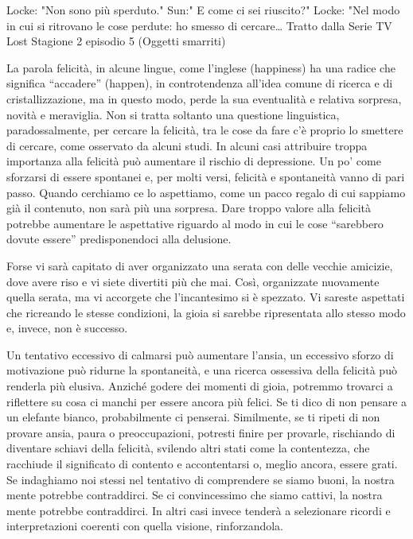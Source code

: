 \documentclass[12pt]{book} %
\begin{document}
Locke: "Non sono più sperduto." 
Sun:" E come ci sei riuscito?" 
Locke: "Nel modo in cui si ritrovano le cose perdute: ho smesso di cercare…
Tratto dalla Serie TV Lost Stagione 2 episodio 5 (Oggetti smarriti)

La parola felicità, in alcune lingue, come l'inglese (happiness) ha una radice che significa “accadere” (happen), in controtendenza all'idea comune di ricerca e di cristallizzazione, ma in questo modo, perde la sua eventualità e relativa sorpresa, novità e meraviglia. Non si tratta soltanto una questione linguistica, paradossalmente, per cercare la felicità, tra le cose da fare c'è proprio lo smettere di cercare, come osservato da alcuni studi. In alcuni casi attribuire troppa importanza alla felicità può aumentare il rischio di depressione. 
Un po' come sforzarsi di essere spontanei e, per molti versi, felicità e spontaneità vanno di pari passo. Quando cerchiamo ce lo aspettiamo, come un pacco regalo di cui sappiamo già il contenuto, non sarà più una sorpresa. 
Dare troppo valore alla felicità potrebbe aumentare le aspettative riguardo al modo in cui le cose “sarebbero dovute essere” predisponendoci alla delusione. 

Forse vi sarà capitato di aver organizzato una serata con delle vecchie amicizie, dove avere riso e vi siete divertiti più che mai.
Così, organizzate nuovamente quella serata, ma vi accorgete che l'incantesimo si è spezzato. Vi sareste aspettati che ricreando le stesse condizioni, la gioia si sarebbe ripresentata allo stesso modo e, invece, non è successo. 

Un tentativo eccessivo di calmarsi può aumentare l'ansia, un eccessivo sforzo di motivazione può ridurne la spontaneità, e una ricerca ossessiva della felicità può renderla più elusiva.
Anziché godere dei momenti di gioia, potremmo trovarci a riflettere su cosa ci manchi per essere ancora più felici. 
Se ti dico di non pensare a un elefante bianco, probabilmente ci penserai. Similmente, se ti ripeti di non provare ansia, paura o preoccupazioni, potresti finire per provarle, rischiando di diventare schiavi della felicità, svilendo altri stati come la contentezza, che racchiude il significato di contento e accontentarsi o, meglio ancora, essere grati. 
Se indaghiamo noi stessi nel tentativo di comprendere se siamo buoni, la nostra mente potrebbe contraddirci. Se ci convincessimo che siamo cattivi, la nostra mente potrebbe contraddirci. In altri casi invece tenderà a selezionare ricordi e interpretazioni coerenti con quella visione, rinforzandola. 
\end{document}
